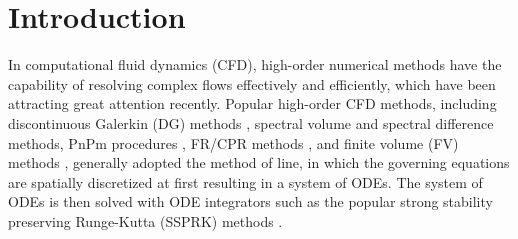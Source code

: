 
\newcommand{\trans}{^\mathrm{T}}

\newcommand{\U}{\mathbf{U}}
\newcommand{\F}{\mathbf{F}}
\newcommand{\x}{\mathbf{x}}

\newcommand{\OO}{\mathbf{\Omega}}
\newcommand{\UM}{\overline{\U}}
\newcommand{\Fn}{\tilde{\F}}
\newcommand{\n}{\mathbf{n}}
\newcommand{\uu}{\overline{\mathbf{U}}}
\newcommand{\R}{\mathbf{R}}
\newcommand{\inc}{\mathrm\Delta}
\newcommand{\Tau}{\mathrm{T}}
\renewcommand{\real}{\mathrm{Re}}
\newcommand{\imag}{\mathrm{Im}}

\newcommand{\CFLt}{\text{CFL}_t}
\newcommand{\CFLtau}{\text{CFL}_\tau}

\newcommand{\eeqref}[1]{Eq.\eqref{#1}}
\newcommand{\us}{\mathbf{u}}


\renewcommand{\Res}{\mathcal{R}}
\newcommand{\Jres}{\mathcal{J}}
\newcommand{\eye}{\mathbf{I}}
\newcommand{\J}{\mathbf{J}}
\newcommand{\FF}{\mathcal{F}}
\newcommand{\Pm}{\mathbf{P}}
\newcommand{\Pe}{\mathrm{P}}

\newcommand{\imagUnit}{\mathrm{i}}

\newcommand{\GG}{\mathcal{G}}


\newcommand{\A}{\mathbf{A}}
\newcommand{\B}{\mathbf{B}}
\newcommand{\C}{\mathbf{C}}

\section{Introduction}
\label{sec:intro}

In computational fluid dynamics (CFD),
high-order numerical methods have the capability of
resolving complex flows effectively and efficiently,
which have been attracting great attention recently.
Popular high-order CFD methods, including discontinuous
Galerkin (DG) methods
\cite{reed1973triangularDG,
    BASSI1997251DG,
    BASSI1997267DG,
    cockburn1989DGII,
    cockburn2001rungeDG},
spectral volume
\cite{WANG2002210_SV}
and spectral difference
\cite{LIU2006780_SD} methods,
PnPm procedures
\cite{DUMBSER20088209_PNPM},
FR/CPR methods
\cite{huynh2007flux_FR,
    huynh2009reconstruction_FR,
    vincent2011new_FR,
    wang2009unifying_CPR},
and finite volume (FV) methods
\cite{wang2016compact_VR,
    wang2016compact1_VR,
    wang2017compact_VR,
    pan2018high_VR,
    zhang2019compact_VR,
    barth1990higher_FV,
    delanaye1999quadratic_FV,
    ollivier1997quasi_ENO,
    friedrich1998weighted_WENO,
    hu1999weighted_WENO,
    dumbser2007quadrature_WENO},
generally adopted the method of line,
in which the governing equations 
are spatially discretized at first
resulting in a system of ODEs.
The system of ODEs is then 
solved with
ODE integrators such as the 
popular strong stability preserving
Runge-Kutta (SSPRK) methods
\cite{gottlieb2001strong_SSPRK}.

